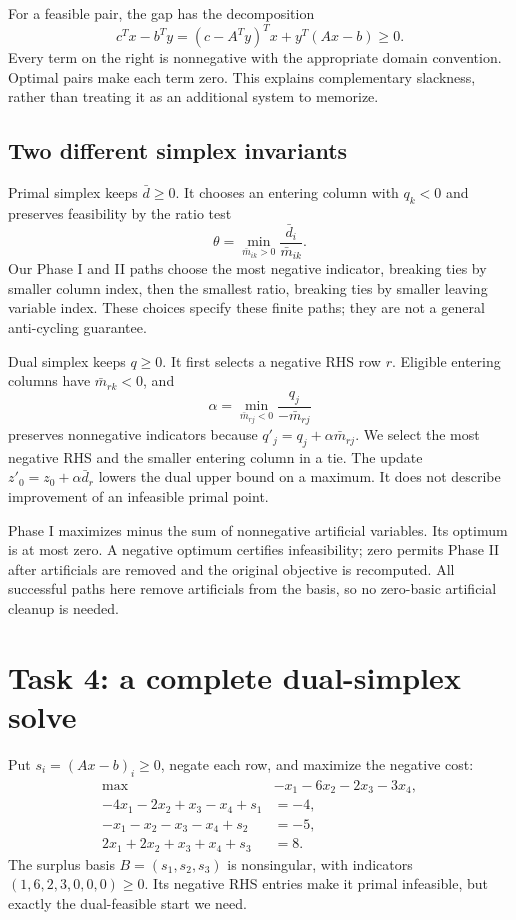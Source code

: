 \documentclass[11pt,a4paper]{article}
\begin{document}
For a feasible pair, the gap has the decomposition
\begin{equation}\label{eq:gap}
  c^Tx-b^Ty=(c-A^Ty)^Tx+y^T(Ax-b)\geq0.
\end{equation}
Every term on the right is nonnegative with the appropriate domain convention.
Optimal pairs make each term zero. This explains complementary slackness,
rather than treating it as an additional system to memorize.

\subsection{Two different simplex invariants}
Primal simplex keeps $\bar d\geq0$. It chooses an entering column with $q_k<0$
and preserves feasibility by the ratio test
\[
  \theta=\min_{\bar m_{ik}>0}\frac{\bar d_i}{\bar m_{ik}}.
\]
Our Phase I and II paths choose the most negative indicator, breaking ties by
smaller column index, then the smallest ratio, breaking ties by smaller leaving
variable index. These choices specify these finite paths; they are not a general
anti-cycling guarantee.

Dual simplex keeps $q\geq0$. It first selects a negative RHS row $r$.
Eligible entering columns have $\bar m_{rk}<0$, and
\[
  \alpha=\min_{\bar m_{rj}<0}\frac{q_j}{-\bar m_{rj}}
\]
preserves nonnegative indicators because $q'_j=q_j+\alpha\bar m_{rj}$.
We select the most negative RHS and the smaller entering column in a tie.
The update $z'_0=z_0+\alpha\bar d_r$ lowers the dual upper bound on a maximum.
It does not describe improvement of an infeasible primal point.

Phase I maximizes minus the sum of nonnegative artificial variables.
Its optimum is at most zero. A negative optimum certifies infeasibility; zero
permits Phase II after artificials are removed and the original objective is
recomputed. All successful paths here remove artificials from the basis, so no
zero-basic artificial cleanup is needed.

\section{Task 4: a complete dual-simplex solve}\label{sec:task4}
Put $s_i=(Ax-b)_i\geq0$, negate each row, and maximize the negative cost:
\[
  \begin{aligned}
    \max\quad &-x_1-6x_2-2x_3-3x_4,\\
    -4x_1-2x_2+x_3-x_4+s_1&=-4,\\
    -x_1-x_2-x_3-x_4+s_2&=-5,\\
    2x_1+2x_2+x_3+x_4+s_3&=8.
  \end{aligned}
\]
The surplus basis $B=(s_1,s_2,s_3)$ is nonsingular, with indicators
$(1,6,2,3,0,0,0)\geq0$. Its negative RHS entries make it primal infeasible,
but exactly the dual-feasible start we need.
\end{document}
